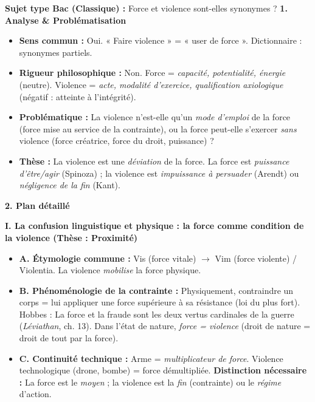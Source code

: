 \documentclass[11pt]{article}
\newcommand{\cle}[1]{{\popxbold\color{popdark}#1}}
\begin{document}
\begin{exoresolu}
\textbf{Sujet type Bac (Classique) :} \guillemotleft Force et violence sont-elles synonymes ? \guillemotright
\tcblower
\textbf{1. Analyse \& Problématisation}
\begin{itemize}
    \item \textbf{Sens commun :} Oui. « Faire violence » = « user de force ». Dictionnaire : synonymes partiels.
    \item \textbf{Rigueur philosophique :} Non. \cle{Force} = \emph{capacité, potentialité, énergie} (neutre). \cle{Violence} = \emph{acte, modalité d'exercice, qualification axiologique} (négatif : atteinte à l'intégrité).
    \item \textbf{Problématique :} La violence n'est-elle qu'un \emph{mode d'emploi} de la force (force mise au service de la contrainte), ou la force peut-elle s'exercer \emph{sans} violence (force créatrice, force du droit, puissance) ?
    \item \textbf{Thèse :} La violence est une \emph{déviation} de la force. La force est \emph{puissance d'être/agir} (Spinoza) ; la violence est \emph{impuissance à persuader} (Arendt) ou \emph{négligence de la fin} (Kant).
\end{itemize}

\textbf{2. Plan détaillé}

\textbf{I. La confusion linguistique et physique : la force comme condition de la violence (Thèse : Proximité)}
\begin{itemize}
    \item \textbf{A. Étymologie commune :} \cle{Vis} (force vitale) $\rightarrow$ \cle{Vim} (force violente) / \cle{Violentia}. La violence \emph{mobilise} la force physique.
    \item \textbf{B. Phénoménologie de la contrainte :} Physiquement, contraindre un corps = lui appliquer une \cle{force} supérieure à sa résistance (loi du plus fort). Hobbes : \guillemotleft La force et la fraude sont les deux vertus cardinales de la guerre \guillemotright (\emph{Léviathan}, ch. 13). Dans l'état de nature, \emph{force = violence} (droit de nature = droit de tout par la force).
    \item \textbf{C. Continuité technique :} Arme = \emph{multiplicateur de force}. Violence technologique (drone, bombe) = force démultipliée. \textbf{Distinction nécessaire :} La force est le \emph{moyen} ; la violence est la \emph{fin} (contrainte) ou le \emph{régime} d'action.
\end{itemize}


\end{exoresolu}
\end{document}
